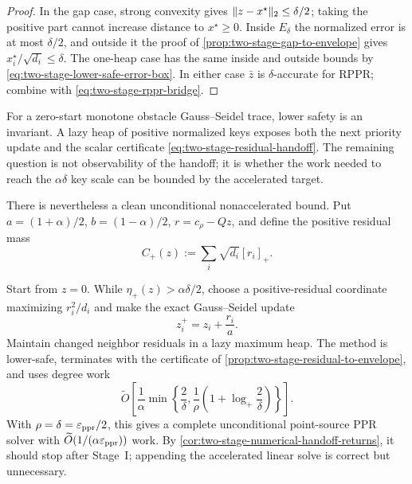 \begin{proof}
In the gap case, strong convexity gives
$\lVert z-x^\star\rVert_2\leq\delta/2$; taking the positive part cannot increase
distance to $x^\star\geq0$.  Inside $E_\delta$ the normalized error is at most
$\delta/2$, and outside it the proof of
\cref{prop:two-stage-gap-to-envelope} gives
$x_i^\star/\sqrt{d_i}\leq\delta$.  The one-heap case has the same inside and
outside bounds by \cref{eq:two-stage-lower-safe-error-box}.  In either case
$\bar z$ is $\delta$-accurate for RPPR; combine with
\cref{eq:two-stage-rppr-bridge}.
\end{proof}

For a zero-start monotone obstacle Gauss--Seidel trace, lower safety is an
invariant.  A lazy heap of positive normalized keys exposes both the next
priority update and the scalar certificate \cref{eq:two-stage-residual-handoff}.
The remaining question is not observability of the handoff; it is whether the
work needed to reach the $\alpha\delta$ key scale can be bounded by the
accelerated target.

There is nevertheless a clean unconditional nonaccelerated bound.  Put
$a=(1+\alpha)/2$, $b=(1-\alpha)/2$, $r=c_\rho-Qz$, and define the positive
residual mass
\begin{equation*}
 C_+(z):=\sum_i\sqrt{d_i}[r_i]_+.
\end{equation*}

\begin{theorem}
\label{thm:two-stage-priority-sor-discovery}
Start from $z=0$.  While
$\eta_+(z)>\alpha\delta/2$, choose a positive-residual coordinate
maximizing $r_i^2/d_i$ and make the exact Gauss--Seidel update
\begin{equation}
 z_i^+=z_i+\frac{r_i}{a}.
 \label{eq:two-stage-priority-sor-update}
\end{equation}
Maintain changed neighbor residuals in a lazy maximum heap.  The method is
lower-safe, terminates with the certificate of
\cref{prop:two-stage-residual-to-envelope}, and uses degree work
\begin{equation}
 \widetilde O\!\left[
  \frac1\alpha\min\left\{
   \frac{2}{\delta},
   \frac1\rho\left(1+\log_+\frac{2}{\delta}\right)
  \right\}
 \right].
 \label{eq:two-stage-priority-sor-work}
\end{equation}
With $\rho=\delta=\varepsilon_{\mathrm{ppr}}/2$, this gives a complete unconditional
point-source PPR solver with $\widetilde O(1/(\alpha\varepsilon_{\mathrm{ppr}}))$ work.
By \cref{cor:two-stage-numerical-handoff-returns}, it should stop after
Stage~I; appending the accelerated linear solve is correct but unnecessary.
\end{theorem}

